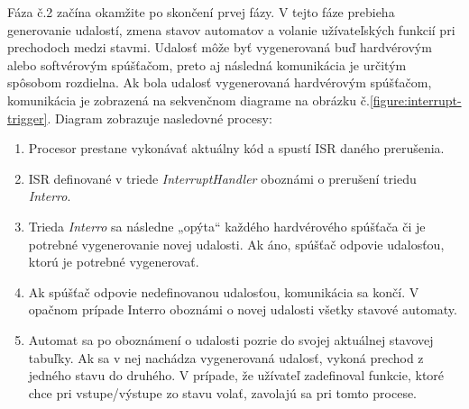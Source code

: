 Fáza č.2 začína okamžite po skončení prvej fázy. V tejto fáze prebieha generovanie  udalostí, zmena stavov automatov a volanie užívateľských funkcií pri prechodoch
medzi stavmi. Udalosť môže byť vygenerovaná buď hardvérovým alebo softvérovým spúšťačom,  preto aj následná komunikácia je určitým spôsobom rozdielna.
Ak bola udalosť vygenerovaná hardvérovým spúšťačom, komunikácia je zobrazená na sekvenčnom diagrame na obrázku č.\ref{figure:interrupt-trigger}.
Diagram zobrazuje nasledovné procesy:
\begin{enumerate}
    \item Procesor prestane vykonávať aktuálny kód a spustí ISR daného prerušenia.
    \item ISR definované v triede \textit{InterruptHandler} oboznámi o prerušení triedu \textit{Interro}.
    \item Trieda \textit{Interro} sa následne „opýta“ každého hardvérového spúšťača či je potrebné vygenerovanie novej udalosti. Ak áno, spúšťač odpovie udalosťou, ktorú je potrebné vygenerovať.
    \item Ak spúšťač odpovie nedefinovanou udalosťou, komunikácia sa končí. V opačnom prípade Interro oboznámi o novej udalosti všetky stavové automaty.
    \item Automat sa po oboznámení o udalosti pozrie do svojej aktuálnej stavovej tabuľky. Ak sa v nej nachádza vygenerovaná udalosť, vykoná prechod z jedného stavu do druhého.
          V prípade, že užívateľ zadefinoval funkcie, ktoré chce pri vstupe/výstupe zo stavu volať, zavolajú sa pri tomto procese.
\end{enumerate}

